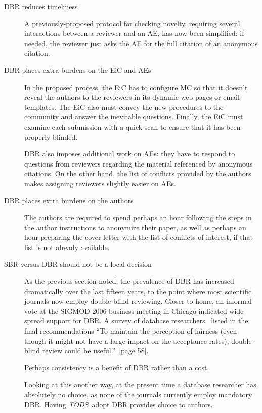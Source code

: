 \documentclass[acmtods,acmnow]{acmtrans2m}
\newcommand{\tods}{{\em TODS\/}}
\begin{document}
\begin{description}
\item[DBR reduces timeliness]
A previously-proposed protocol for checking novelty, requiring
several interactions between a reviewer and an AE, has now been simplified:
if needed, the reviewer just asks the AE for the full citation of an
anonymous citation.

\item[DBR places extra burdens on the EiC and AEs]
In the proposed process, the EiC has to configure MC so that it doesn't
reveal the authors to the reviewers in its dynamic web pages or email
templates. The EiC also must convey the new procedures to the community and
answer the inevitable questions. Finally, the EiC must examine each
submission with a quick scan to ensure that it has been properly blinded.

DBR also imposes additional work on AEs: they have to respond to questions
from reviewers regarding the material referenced by anonymous citations. On
the other hand, the list of conflicts provided by the authors makes
assigning reviewers slightly easier on AEs.

\item[DBR places extra burdens on the authors]
The authors are required to spend perhaps an hour following the steps in the
author instructions to anonymize their paper, as well as perhaps an hour
preparing the cover letter with the list of conflicts of interest, if that
list is not already available.

\item[SBR versus DBR should not be a local decision]
As the previous section noted, the prevalence of DBR has
increased dramatically over the last fifteen years, to the point where most
scientific journals now employ double-blind reviewing.
Closer to home, an informal vote at the SIGMOD 2006 business meeting in
Chicago indicated wide-spread support for DBR. A survey of database
researchers~\cite{Sirbu06} listed in the final recommendations ``To
maintain the perception of fairness (even though it might not have a large
impact on the acceptance rates), double-blind review could be
useful.''~[page 58].

Perhaps consistency is a benefit of DBR rather than a cost.

Looking at this another way, at the present time a database researcher has
absolutely no choice, as none of the journals currently employ mandatory
DBR. Having \tods\ adopt DBR provides choice to authors.
\end{description}
\end{document}
